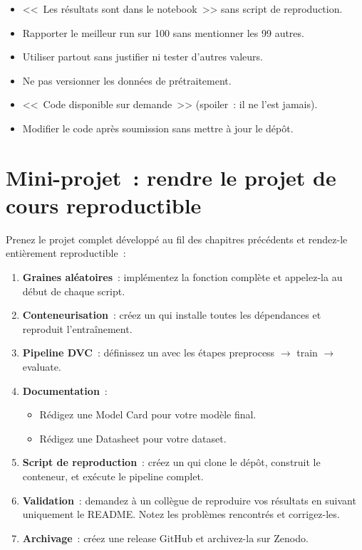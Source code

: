 \begin{antipattern}[title=\textbf{Anti-patterns de la reproductibilit\'e}]
\begin{itemize}
  \item <<~Les r\'esultats sont dans le notebook~>> sans script de
    reproduction.
  \item Rapporter le meilleur run sur 100 sans mentionner les 99 autres.
  \item Utiliser  partout sans justifier ni
    tester d'autres valeurs.
  \item Ne pas versionner les donn\'ees de pr\'etraitement.
  \item <<~Code disponible sur demande~>> (spoiler~: il ne l'est jamais).
  \item Modifier le code apr\`es soumission sans mettre \`a jour le d\'ep\^ot.
\end{itemize}
\end{antipattern}

\section{Mini-projet~: rendre le projet de cours reproductible}
\label{sec:mini-project-ch11}

\begin{miniprojet}[title=\textbf{Mini-projet 11~: Reproductibilit\'e compl\`ete}]
Prenez le projet complet d\'evelopp\'e au fil des chapitres pr\'ec\'edents et
rendez-le enti\`erement reproductible~:
\begin{enumerate}
  \item \textbf{Graines al\'eatoires}~: impl\'ementez la fonction
     compl\`ete et appelez-la au d\'ebut de chaque script.
  \item \textbf{Conteneurisation}~: cr\'eez un  qui
    installe toutes les d\'ependances et reproduit l'entra\^inement.
  \item \textbf{Pipeline DVC}~: d\'efinissez un  avec les
    \'etapes preprocess $\to$ train $\to$ evaluate.
  \item \textbf{Documentation}~:
    \begin{itemize}
      \item R\'edigez une Model Card pour votre mod\`ele final.
      \item R\'edigez une Datasheet pour votre dataset.
    \end{itemize}
  \item \textbf{Script de reproduction}~: cr\'eez un 
    qui clone le d\'ep\^ot, construit le conteneur, et ex\'ecute le pipeline
    complet.
  \item \textbf{Validation}~: demandez \`a un coll\`egue de reproduire vos
    r\'esultats en suivant uniquement le README. Notez les probl\`emes
    rencontr\'es et corrigez-les.
  \item \textbf{Archivage}~: cr\'eez une release GitHub et archivez-la
    sur Zenodo.
\end{enumerate}
\end{miniprojet}

